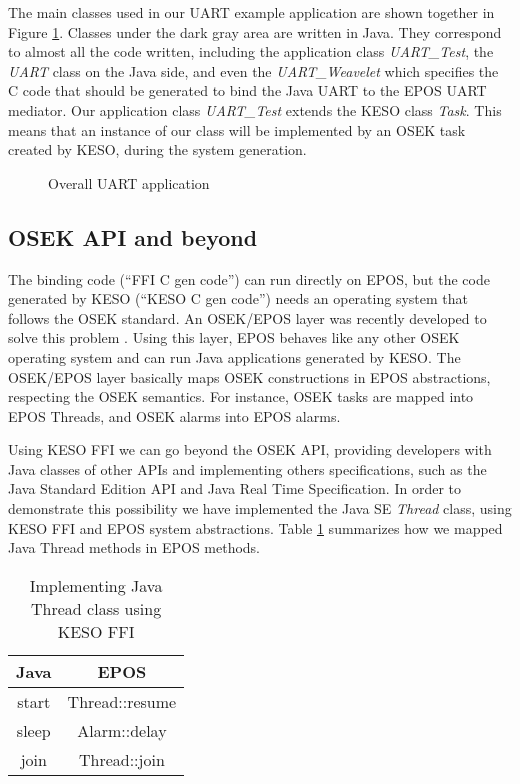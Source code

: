 \documentclass[12pt]{article} %
\newcommand{\fig}[4][htb]{
  \begin{figure}[#1] {\centering\scalebox{#2}{\texttt{[image: fig/\#3]}}\par}
    \caption{#4\label{fig:#3}}
  \end{figure}
}
\begin{document}
%
The main classes used in our UART example application are shown together in Figure \ref{fig:overall_uart_application}. Classes under the dark gray area are written in Java. They correspond to almost all the code written, including the application class \emph{UART\_Test}, the \emph{UART} class on the Java side, and even the \emph{UART\_Weavelet} which specifies the C code that should be generated to bind the Java UART to the EPOS UART mediator. Our application class \emph{UART\_Test} extends the KESO class \emph{Task}. This means that an instance of our class will be implemented by an OSEK task created by KESO, during the system generation. %

\fig{.3}{overall_uart_application}{Overall UART application}


\subsection{OSEK API and beyond}
The binding code (``FFI C gen code'') can run directly on EPOS, but the code generated by KESO (``KESO C gen code'') needs an operating system that follows the OSEK standard. An OSEK/EPOS layer was recently developed to solve this problem \cite{Bauer:Thesis:2008}. Using this layer, EPOS behaves like any other OSEK operating system and can run Java applications generated by KESO. The OSEK/EPOS layer basically maps OSEK constructions in EPOS abstractions, respecting the OSEK semantics. For instance, OSEK tasks are mapped into EPOS Threads, and OSEK alarms into EPOS alarms.

Using KESO FFI we can go beyond the OSEK API, providing developers with Java 
classes of other APIs and implementing others specifications, such as the Java
Standard Edition API and Java Real Time Specification. In order to demonstrate
this possibility we have implemented the Java SE \emph{Thread} class, using 
KESO FFI and EPOS system abstractions.
Table \ref{tab:thread_mapping} summarizes how we mapped Java Thread methods in
EPOS methods.

\begin{table}[t]
\begin{center}
\begin{tabular}{|c|c|}
\hline
\textbf{Java} & \textbf{EPOS} \\
\hline
start & Thread::resume \\
\hline
sleep & Alarm::delay \\
\hline
join & Thread::join \\
\hline
\end{tabular}
\caption{Implementing Java Thread class using KESO FFI}
\label{tab:thread_mapping}
\end{center}
\end{table}
\end{document}

